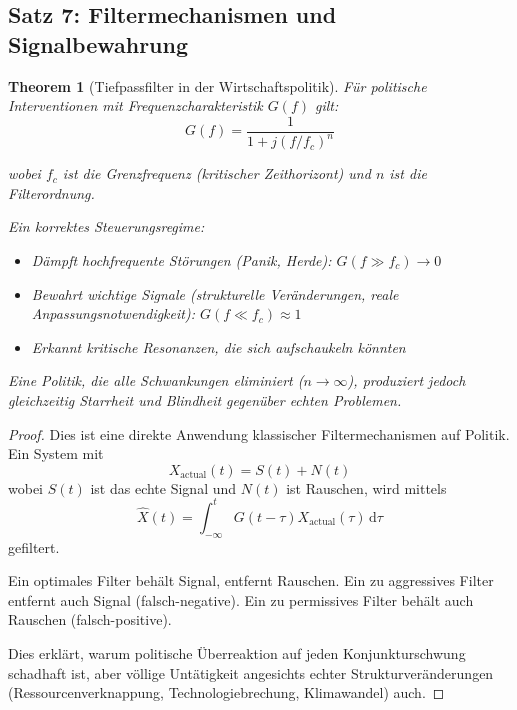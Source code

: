 \documentclass[a4paper, 12pt, twoside, openright]{report}
\newtheorem{theorem}{Theorem}[section]
\theoremstyle{definition}
\theoremstyle{definition}
\begin{document}
\subsection{Satz 7: Filtermechanismen und Signalbewahrung}

\begin{theorem}[Tiefpassfilter in der Wirtschaftspolitik]
\label{thm:filter-signal}
Für politische Interventionen mit Frequenzcharakteristik $G(f)$ gilt:
\begin{equation}
G(f) = \frac{1}{1 + j(f/f_c)^n}
\end{equation}

wobei $f_c$ ist die Grenzfrequenz (kritischer Zeithorizont) und $n$ ist die Filterordnung.

Ein korrektes Steuerungsregime:
\begin{itemize}
\item Dämpft hochfrequente Störungen (Panik, Herde): $G(f \gg f_c) \to 0$
\item Bewahrt wichtige Signale (strukturelle Veränderungen, reale Anpassungsnotwendigkeit): $G(f \ll f_c) \approx 1$
\item Erkannt kritische Resonanzen, die sich aufschaukeln könnten
\end{itemize}

Eine Politik, die \emph{alle} Schwankungen eliminiert ($n \to \infty$), produziert jedoch gleichzeitig Starrheit und Blindheit gegenüber echten Problemen.
\end{theorem}

\begin{proof}
Dies ist eine direkte Anwendung klassischer Filtermechanismen auf Politik. Ein System mit
\begin{equation}
X_{\text{actual}}(t) = S(t) + N(t)
\end{equation}
wobei $S(t)$ ist das echte Signal und $N(t)$ ist Rauschen, wird mittels
\begin{equation}
\hat{X}(t) = \int_{-\infty}^{t} G(t-\tau) X_{\text{actual}}(\tau) \, \mathrm{d}\tau
\end{equation}
gefiltert. 

Ein optimales Filter behält Signal, entfernt Rauschen. Ein zu aggressives Filter entfernt auch Signal (falsch-negative). Ein zu permissives Filter behält auch Rauschen (falsch-positive).

Dies erklärt, warum politische Überreaktion auf jeden Konjunkturschwung schadhaft ist, aber völlige Untätigkeit angesichts echter Strukturveränderungen (Ressourcenverknappung, Technologiebrechung, Klimawandel) auch.
\end{proof}
\end{document}
